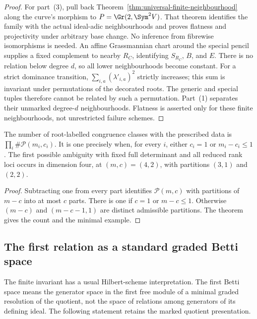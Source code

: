 \begin{proof}
For part~(3), pull back Theorem~\ref{thm:universal-finite-neighbourhood}
along the curve's morphism to \(P=\Gr(2,\Sym^2V)\).
That theorem identifies the family with the actual ideal-adic
neighbourhoods and proves flatness and projectivity under arbitrary
base change. No inference from fibrewise isomorphisms is needed.
An affine Grassmannian chart around the special pencil supplies a
fixed complement to nearby \(R_C\), identifying \(S_{R_C}\),
\(B\), and \(E\). There is no relation below degree \(d\),
so all lower neighbourhoods become constant. For a strict dominance
transition, \(\sum_{i,a}(\lambda'_{i,a})^2\) strictly increases;
this sum is invariant under permutations of the decorated roots.
The generic and special tuples therefore cannot be related by such
a permutation. Part~(1) separates their unmarked degree-\(d\)
neighbourhoods. Flatness is asserted only for these finite
neighbourhoods, not unrestricted failure schemes.
\end{proof}

\begin{corollary}
\label{cor:fixed-spectral-ambiguity}
The number of root-labelled congruence classes with the prescribed
data is \(\prod_i\#\mathcal P(m_i,c_i)\). It is one precisely
when, for every \(i\), either \(c_i=1\) or \(m_i-c_i\le1\).
The first possible ambiguity with fixed full determinant and all
reduced rank loci occurs in dimension four, at \((m,c)=(4,2)\),
with partitions \((3,1)\) and \((2,2)\).
\end{corollary}
\begin{proof}
Subtracting one from every part identifies \(\mathcal P(m,c)\)
with partitions of \(m-c\) into at most \(c\) parts.
There is one if \(c=1\) or \(m-c\le1\). Otherwise
\((m-c)\) and \((m-c-1,1)\) are distinct admissible partitions.
The theorem gives the count and the minimal example.
\end{proof}

\subsection{The first relation as a standard graded Betti space}

The finite invariant has a usual Hilbert-scheme interpretation.
The first Betti space means the generator space in the first free
module of a minimal graded resolution of the quotient, not the space
of relations among generators of its defining ideal. The following
statement retains the marked quotient presentation.

